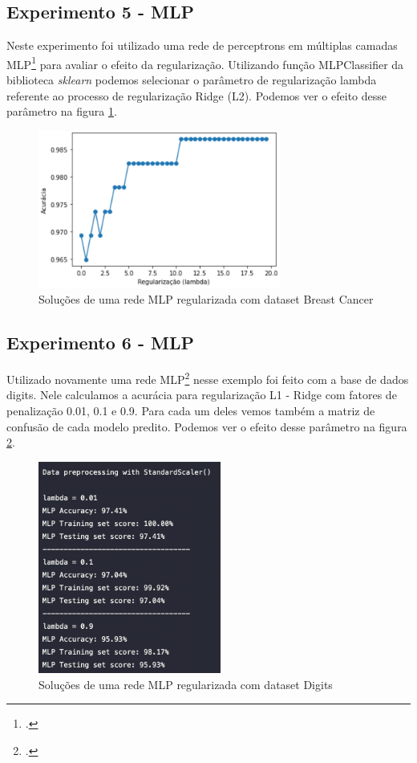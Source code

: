 \subsection*{Experimento 5 - MLP}

Neste experimento foi utilizado uma rede de perceptrons em múltiplas camadas MLP\footcite[]{Multilayer Perceptron} para avaliar o efeito da regularização.
Utilizando função MLPClassifier da biblioteca \emph{sklearn}\cite*[]{scikitlearn} podemos selecionar o parâmetro de regularização lambda referente ao processo de regularização Ridge (L2).
Podemos ver o efeito desse parâmetro na figura \ref*{img8}.

\begin{figure}[H]
    \center
    \includegraphics[width=8cm]{images/img12.png}
    \caption{\label{img8}Soluções de uma rede MLP regularizada com dataset Breast Cancer}
\end{figure}

\subsection*{Experimento 6 - MLP}

Utilizado novamente uma rede MLP\footcite[]{Multilayer Perceptron} nesse exemplo foi feito 
com a base de dados digits. Nele calculamos a acurácia para regularização L1 - Ridge com fatores de penalização 0.01, 0.1 e 0.9.
Para cada um deles vemos também a matriz de confusão de cada modelo predito.
Podemos ver o efeito desse parâmetro na figura \ref*{img9}.

\begin{figure}[H]
    \center
    \includegraphics[width=6cm]{images/img13.png}
    \caption{\label{img9}Soluções de uma rede MLP regularizada com dataset Digits}
\end{figure}

